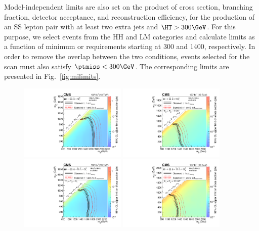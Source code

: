 Model-independent limits are also set on the product of cross section, branching fraction, detector acceptance, and reconstruction efficiency,
for the production of an SS lepton pair with at least two extra jets and $\HT>300\GeV$.
For this purpose, we select events from the HH and LM categories
and calculate limits as a function of minimum \ptmiss or \HT requirements
starting at 300 and 1400\GeV, respectively.
In order to remove the overlap between the two conditions, events selected for the \HT scan must also satisfy $\ptmiss<300\GeV$.
The corresponding limits are presented in Fig.~\ref{fig:milimits}.


\begin{figure}[!hbtp]
\centering
\includegraphics[width=0.45\textwidth]{figs/ssp/scan_t1tttt.pdf}
\includegraphics[width=0.45\textwidth]{figs/ssp/scan_t1ttbb.pdf}
\includegraphics[width=0.45\textwidth]{figs/ssp/scan_t5tttt.pdf}
\includegraphics[width=0.45\textwidth]{figs/ssp/scan_t5ttcc.pdf}

\end{figure}
